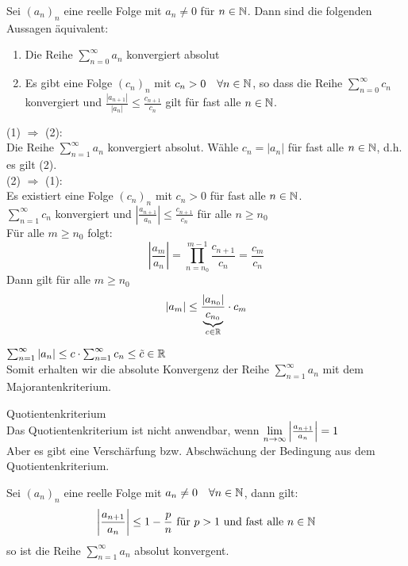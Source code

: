 \documentclass[../ana1u.tex]{subfiles}
\begin{document}
\begin{lem}
    Sei \((a_n)_n\) eine reelle Folge mit \(a_n \neq 0\) für \(n \in \mathbb{N}\). Dann sind die folgenden Aussagen äquivalent:
    \begin{enumerate}
        \item 
            Die Reihe \(\sum_{n=0}^{\infty} a_n\) konvergiert absolut
        \item
            Es gibt eine Folge \((c_n)_n\) mit \(c_n > 0 \quad \forall n \in \mathbb{N}\), so dass die Reihe \(\sum_{n=0}^{\infty} c_n\) konvergiert und	\(\frac{|a_{n+1}|}{|a_n|} \leq \frac{c_{n+1}}{c_n}\) gilt für fast alle \(n \in \mathbb{N}\).
    \end{enumerate}
\end{lem}
\begin{bew}
    (1) \(\Rightarrow\) (2):\\
    Die Reihe \(\sum_{n=1}^{\infty} a_n\) konvergiert absolut. Wähle \(c_n = |a_n|\) für fast alle \(n \in \mathbb{N}\), d.h. es gilt (2).\\
    (2) \(\Rightarrow\) (1):\\
    Es existiert eine Folge \((c_n)_n\) mit \(c_n > 0\) für fast alle \(n \in \mathbb{N}\).\\
    \(\sum_{n=1}^{\infty} c_n\) konvergiert und \(\left|\frac{a_{n+1}}{a_n}\right| \leq \frac{c_{n+1}}{c_n}\) für alle \(n \geq n_0\)\\
    Für alle \(m \geq n_0\) folgt:
    \[\left|\frac{a_{m}}{a_n}\right| = \prod_{n=n_0}^{m-1} \frac{c_{n+1}}{c_n} = \frac{c_{m}}{c_n}\]
    Dann gilt für alle \(m \geq n_0\)
    \[|a_m| \leq \frac{|a_{n_0}|}{\underbrace{c_{n_0}}_{c \in \mathbb{R}}} \cdot c_m \]
\end{bew}
\begin{bem}
    \(\sum_{n=1}^{\infty} |a_n| \leq c \cdot \sum_{n=1}^{\infty} c_n \leq \tilde{c} \in \mathbb{R}\)\\
    Somit erhalten wir die absolute Konvergenz der Reihe \(\sum_{n=1}^{\infty} a_n\) mit dem Majorantenkriterium.
\end{bem}
\begin{bem}
    Quotientenkriterium\\
    Das Quotientenkriterium ist nicht anwendbar, wenn \(\lim\limits_{n\rightarrow\infty} \left|\frac{a_{n+1}}{a_n}\right| = 1\)\\
    Aber es gibt eine Verschärfung bzw. Abschwächung der Bedingung aus dem Quotientenkriterium.
\end{bem}
\begin{kor}
    Sei \((a_n)_n\) eine reelle Folge mit \(a_n \neq 0 \quad \forall n \in \mathbb{N}\), dann gilt:
    \[\left|\frac{a_{n+1}}{a_n}\right| \leq 1 - \frac{p}{n} \text{ für } p > 1 \text{ und fast alle } n \in \mathbb{N}\]
    so ist die Reihe \(\sum_{n=1}^{\infty} a_n\) absolut konvergent.
\end{kor}
\end{document}

